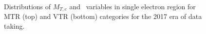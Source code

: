 \begin{figure}[htbp]
{    }
  \caption{Distributions of $M_{T,e}$ and \mindphinoe~variables in single electron region for MTR (top) and VTR (bottom) categories for the 2017 era of data taking.}
  \label{fig:2017_Wenu_2}
\end{figure}

